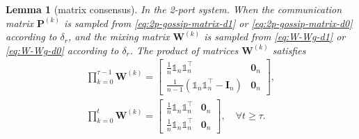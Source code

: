 \documentclass{article}
\newcommand{\vzero}{\mathbf{0}}
\newcommand{\vI}{\mathbf{I}}
\newcommand{\vW}{\mathbf{W}}
\newcommand{\vP}{\mathbf{P}}
\newcommand{\ko}{{(k)}}
\newcommand{\bbone}{\mathds{1}}
\theoremstyle{plain}
\newtheorem{lemma}[theorem]{Lemma}
\theoremstyle{definition}
\begin{document}
\begin{lemma}[matrix consensus]
In the 2-port system. When the communication matrix $\vP^\ko$ is sampled from \eqref{eq:2p-gossip-matrix-d1} or \eqref{eq:2p-gossip-matrix-d0} {according to $\delta_r$}, and the mixing matrix $\vW^\ko$ is sampled from \eqref{eq:W-Wg-d1} or \eqref{eq:W-Wg-d0} {according to $\delta_r$}. The product of  matrices $\vW^\ko$ satisfies
\begin{gather}
\label{eq:matrix-consensus1}
\prod_{k=0}^{\tau-1}\vW^\ko=
\left[
\begin{array}{cc}
    \frac{1}{n}\bbone_n\bbone_n^\top & \vzero_n \\
    \frac{1}{n-1}(\bbone_n\bbone_n^\top-\vI_n) & \vzero_n
\end{array}\right],\\
\label{eq:matrix-consensus2}
\prod_{k=0}^{t}\vW^\ko=
\left[
\begin{array}{cc}
    \frac{1}{n}\bbone_n\bbone_n^\top & \vzero_n \\
    \frac{1}{n}\bbone_n\bbone_n^\top & \vzero_n
\end{array}\right], \quad \forall t\geq \tau.
\end{gather}
\end{lemma}
\end{document}
